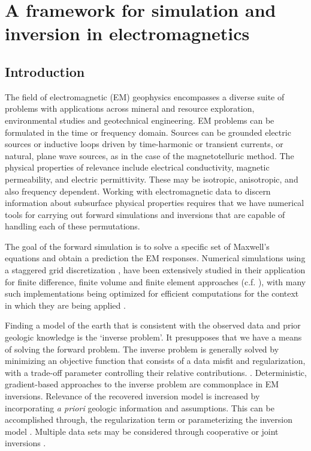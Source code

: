 
\chapter{A framework for simulation and inversion in electromagnetics}
\label{ch:simpegem}

\section{Introduction}
\label{sec:intro}

The field of electromagnetic (EM) geophysics encompasses a diverse suite of
problems with applications across mineral and resource exploration,
environmental studies and geotechnical engineering. EM problems can be
formulated in the time or frequency domain. Sources can be grounded electric
sources or inductive loops driven by time-harmonic or transient currents, or
natural, plane wave sources, as in the case of the magnetotelluric method. The
physical properties of relevance include electrical conductivity, magnetic
permeability, and electric permittivity. These may be  isotropic, anisotropic,
and also frequency dependent. Working with electromagnetic data to discern
information about subsurface physical properties requires that we have
numerical tools for carrying out forward simulations and inversions that are
capable of handling each of these permutations.


The goal of the forward simulation is to solve a specific set of Maxwell's
equations and obtain a prediction the EM responses. Numerical simulations
using a staggered grid discretization \citep{Yee1966}, have been extensively
studied in their application for finite difference, finite volume and finite
element approaches (c.f. \cite{newman1999, Haber2014a}), with many such
implementations being optimized for efficient computations for the context in
which they are being applied \citep{Haber2001, Key2007,  Kelbert2014,
Yang2014}.


Finding a model of the earth that is consistent with the observed data and
prior geologic knowledge is the `inverse problem'. It presupposes
that we have a means of solving the forward problem. The inverse problem is
generally solved by minimizing an  objective function that consists of a data
misfit and regularization, with a trade-off parameter controlling their
relative contributions. \citep{Tikhonov1977, Parker1980, Constable1987}.
Deterministic, gradient-based approaches to the inverse problem are
commonplace in EM inversions.   Relevance of the recovered inversion model is
increased by incorporating \emph{a priori} geologic information and
assumptions. This can be accomplished through, the regularization term
\citep{OldenburgTutorial, Constable1987} or parameterizing the inversion model
\citep{Pidlisecky2011, McMillan2015a, Kang2015}. Multiple data sets may be
considered through cooperative or joint inversions \citep{Haber1998,
McMillan2015}.

